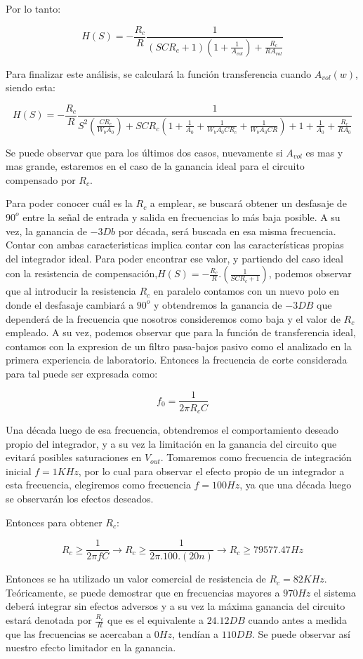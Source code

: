 Por lo tanto:

$$H(S)= -\frac{R_c}{R}\frac{1}{(SCR_c+1)(1+\frac{1}{A_{vol}})+\frac{R_c}{RA_{vol}}} $$

Para finalizar este análisis, se calculará la función transferencia cuando $A_{vol}(w)$, siendo esta:

$$H(S)=-\frac{R_c}{R}\frac{1}{S^2(\frac{CR_c}{W_bA_0})+SCR_c(1+\frac{1}{A_0}+\frac{1}{W_bA_0CR_c}+\frac{1}{W_bA_0CR})+1+\frac{1}{A_0}+\frac{R_c}{RA_0}}$$

Se puede observar que para los últimos dos casos, nuevamente si $A_{vol}$ es mas y mas grande, estaremos en el caso de la ganancia ideal para el circuito compensado
por $R_c$.


Para poder conocer cuál es la $R_c$ a emplear, se buscará obtener un desfasaje de $90^o$ entre la señal de entrada y salida en frecuencias lo más baja posible.
A su vez, la ganancia de $-3Db$ por década, será buscada en esa misma frecuencia.
Contar con ambas caracteristicas implica contar con las características propias del integrador ideal. 
Para poder encontrar ese valor, y partiendo del caso ideal con la resistencia
de compensación,$ H(S) = - \frac{R_c}{R}.(\frac{1}{SCR_c+1})$, podemos observar que al introducir la resistencia $R_c$
en paralelo contamos con un nuevo polo en donde el desfasaje cambiará a $90^o$ y obtendremos la ganancia de $-3DB$ que dependerá de la frecuencia que nosotros consideremos como baja y el valor de $R_c$ empleado.
A su vez, podemos observar que para la función de transferencia ideal, contamos con la expresion de un filtro pasa-bajos pasivo como el analizado en la primera experiencia
de laboratorio. Entonces la frecuencia de corte considerada para tal puede ser expresada como:

$$f_0 = \frac{1}{2\pi R_cC}$$

Una década luego de esa frecuencia, obtendremos el comportamiento deseado propio del integrador, y a su vez la limitación en la ganancia del circuito que evitará posibles saturaciones en $V_{out}$.
Tomaremos como frecuencia de integración inicial $f=1KHz$, por lo cual para observar el efecto propio de un integrador a esta frecuencia, elegiremos como frecuencia
$f=100Hz$, ya que una década luego se observarán los efectos deseados. 

Entonces para obtener $R_c$:

$$R_c \geq \frac {1}{2\pi fC} \longrightarrow R_c \geq \frac {1}{2\pi .100.(20n)}\longrightarrow R_c \geq 79577.47 Hz$$

Entonces se ha utilizado un valor comercial de resistencia de $R_c=82KHz$. Teóricamente, se puede demostrar que en frecuencias mayores
a $970 Hz$ el sistema deberá integrar sin efectos adversos y a su vez la máxima ganancia del circuito estará denotada por $\frac {R_c}{R}$ que es el equivalente a
$24.12DB$ cuando antes a medida que las frecuencias se acercaban a $0Hz$, tendían a $110DB$. Se puede observar así nuestro efecto limitador en la ganancia.

